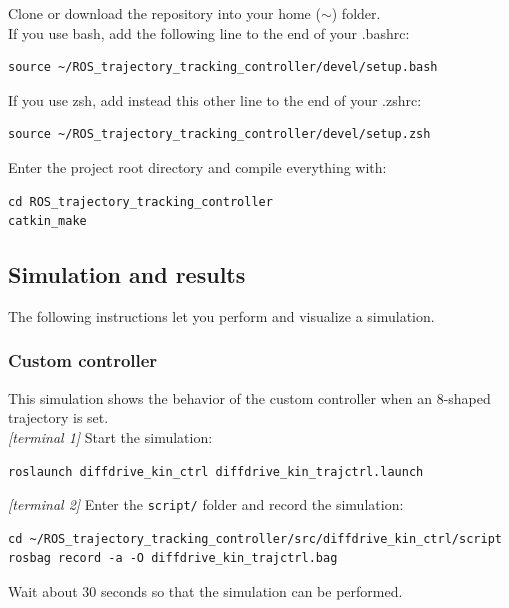 \documentclass[11pt,a4paper]{article}
\begin{document}
Clone or download the repository into your home ($\sim$) folder.\\

If you use bash, add the following line to the end of your .bashrc:
\begin{lstlisting}
source ~/ROS_trajectory_tracking_controller/devel/setup.bash
\end{lstlisting}

If you use zsh, add instead this other line to the end of your .zshrc:
\begin{lstlisting}
source ~/ROS_trajectory_tracking_controller/devel/setup.zsh
\end{lstlisting}

Enter the project root directory and compile everything with:
\begin{lstlisting}
cd ROS_trajectory_tracking_controller
catkin_make
\end{lstlisting}



\subsection{Simulation and results}

The following instructions let you perform and visualize a simulation.

\subsubsection{Custom controller}

This simulation shows the behavior of the custom controller when an 8-shaped trajectory is set.\\

\textit{[terminal 1]} Start the simulation:
\begin{lstlisting}
roslaunch diffdrive_kin_ctrl diffdrive_kin_trajctrl.launch
\end{lstlisting}


\textit{[terminal 2]} Enter the \texttt{script/} folder and record the simulation:
\begin{lstlisting}
cd ~/ROS_trajectory_tracking_controller/src/diffdrive_kin_ctrl/script
rosbag record -a -O diffdrive_kin_trajctrl.bag
\end{lstlisting}

Wait about 30 seconds so that the simulation can be performed.\\
\end{document}
